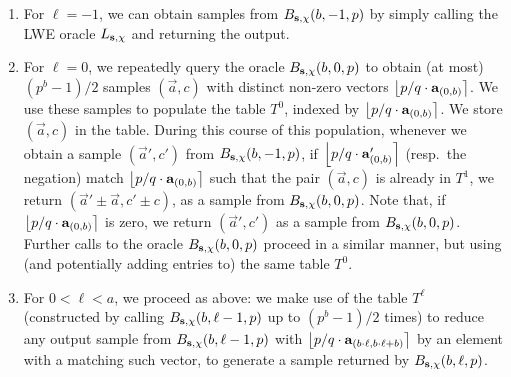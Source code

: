 \begin{enumerate}
\item For $\ell = -1$, we can obtain samples from ${B_{\mathbf{s},\chi}(b,-1,p)}$ by simply calling the LWE oracle $L_{\mathbf{s},\chi}$ and returning the output.
\item For $\ell = 0$, we repeatedly query the oracle ${B_{\mathbf{s},\chi}(b,0,p)}$ to obtain (at most) $(p^b-1)/2$ samples $(\vec{a},c)$ with distinct non-zero vectors $\round{p/q \cdot \vec{a}_{(0,b)}}$. We use these samples to populate the table $T^0$, indexed by $\round{p/q \cdot \vec{a}_{(0,b)}}$. We store $(\vec{a}, c)$ in the table. During this course of this population, whenever we obtain a sample $(\vec{a}',c')$ from ${B_{\mathbf{s},\chi}(b,-1,p)}$, if $\round{p/q \cdot \vec{a}'_{(0,b)}}$ (resp.\ the negation) match $\round{p/q \cdot \vec{a}_{(0,b)}}$ such that the pair $(\vec{a},c)$ is already in $T^1$, we return $(\vec{a}'\pm \vec{a},c'\pm c)$, as a sample from $B_{\mathbf{s},\chi}(b,0,p)$. Note that, if  $\round{p/q \cdot \vec{a}_{(0,b)}}$ is zero, we return $(\vec{a}',c')$ as a sample from ${B_{\mathbf{s},\chi}(b,0,p)}$. Further calls to the oracle ${B_{\mathbf{s},\chi}(b,0,p)}$ proceed in a similar manner, but using (and potentially adding entries to) the same table $T^0$.
\item For $0 < \ell < a$, we proceed as above: we make use of the table $T^{\ell}$ (constructed by calling ${B_{\mathbf{s},\chi}(b,\ell - 1,p)}$ up to $(p^b-1)/2$ times) to reduce any output sample from ${B_{\mathbf{s},\chi}(b,\ell - 1,p)}$ with $\round{p/q \cdot \vec{a}_{(b \cdot \ell,b \cdot \ell+b)}}$ by an element with a matching such vector, to generate a sample returned by ${B_{\mathbf{s},\chi}(b,\ell,p)}$.
\end{enumerate}


